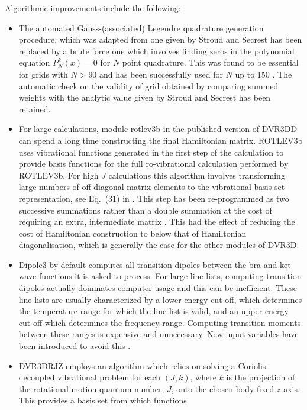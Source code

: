 \documentclass[12pt]{article}
\newcommand{\2}{$_{2}$}
\newcommand{\3}{$_{3}$}
\newcommand{\4}{$_{4}$}
\begin{document}
Algorithmic improvements include the following:
\begin{itemize}
\item The automated Gauss-(associated) Legendre quadrature generation
  procedure, which was adapted from one given by Stroud and Secrest
  \cite{jt66} has been replaced by a brute force one which involves
  finding zeros in the polynomial equation \(P_N^k(x)=0\) for $N$
  point quadrature.  This was found to be essential for grids with $N
  > 90$ and has been successfully used for $N$ up to 150 \cite{jt635}.
  The automatic check on the validity of grid obtained by comparing
  summed weights with the analytic value given by Stroud and Secrest
  has been retained.
\item For large calculations, module {\sc rotlev3b}
in  the published version of {\sc DVR3DD} can
spend a long time constructing the final Hamiltonian matrix.
{\sc ROTLEV3b} uses vibrational functions
generated in the first step of the calculation \citep{jt46} to provide
basis functions for the full ro-vibrational calculation performed by
{\sc ROTLEV3b}. For high $J$ calculations this algorithm involves
transforming large numbers of off-diagonal matrix elements to the
vibrational basis set representation, see Eq.~(31) in \citet{jt114}.
This step has been re-programmed as two successive summations rather
than a double summation at the cost of requiring an extra, intermediate
matrix \cite{jth2s}. This had the effect of reducing the cost of Hamiltonian
construction to below that of Hamiltonian diagonalisation, which is
generally the case for the other modules of {\sc DVR3D}.
\item {\sc Dipole3}  by default computes all
  transition dipoles between the bra and ket wave functions it is asked
  to process. For large line lists, computing transition dipoles
  actually dominates computer usage and this can be inefficient.
  These line lists are usually characterized by a lower energy cut-off,
  which determines the temperature range for which the line list is
  valid, and an upper energy cut-off which determines the frequency
  range. Computing transition moments between these ranges is
  expensive and unnecessary. New input variables have been introduced
  to avoid this \cite{jt538}.
\item {\sc DVR3DRJZ} employs an algorithm which relies on solving a Coriolis-decoupled
  vibrational problem for each $(J,k)$, where $k$ is the projection of
  the rotational motion quantum number, $J$, onto the chosen
  body-fixed $z$ axis. This provides a basis set from which functions

\end{itemize}
\end{document}
